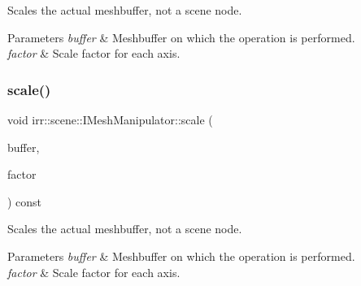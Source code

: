 Scales the actual meshbuffer, not a scene node. 


\begin{DoxyParams}{Parameters}
{\em buffer} & Meshbuffer on which the operation is performed. \\
\hline
{\em factor} & Scale factor for each axis. \\
\hline
\end{DoxyParams}
\mbox{\label{classirr_1_1scene_1_1IMeshManipulator_a6aa8b1bd153c7e524e8200988078282f}} 
\subsubsection{\texorpdfstring{scale()}{scale()}\hspace{0.1cm}{\footnotesize\ttfamily [4/4]}}
{\footnotesize\ttfamily void irr\+::scene\+::\+I\+Mesh\+Manipulator\+::scale (\begin{DoxyParamCaption}\item[{\hyperlink{classirr_1_1scene_1_1IMeshBuffer}{I\+Mesh\+Buffer} $\ast$}]{buffer,  }\item[{const \hyperlink{namespaceirr_1_1core_ae6e2b2a6c552833ebbd5b7463d03586b}{core\+::vector3df} \&}]{factor }\end{DoxyParamCaption}) const\hspace{0.3cm}{\ttfamily [inline]}}



Scales the actual meshbuffer, not a scene node. 


\begin{DoxyParams}{Parameters}
{\em buffer} & Meshbuffer on which the operation is performed. \\
\hline
{\em factor} & Scale factor for each axis. \\
\hline
\end{DoxyParams}
\mbox{\label{classirr_1_1scene_1_1IMeshManipulator_a00f8ef80adfd5bb15644b64e8cd9f55e}} 
